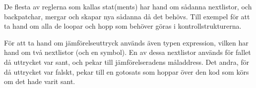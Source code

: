 		De flesta av reglerna som kallas stat(ments) har hand om sådanna nextlistor, och backpatchar, mergar och skapar nya sådanna då det behövs. Till exempel för att ta hand om alla de loopar och hopp som behöver göras i kontrollstrukturerna.
		
		För att ta hand om jämförelseuttryck används även typen expression, vilken har hand om två nextlistor (och en symbol). En av dessa nextlistor används för fallet då uttrycket var sant, och pekar till jämförelseradens måladdress. Det andra, för då uttrycket var falskt, pekar till en gotosats som hoppar över den kod som körs om det hade varit sant. 

\pagebreak